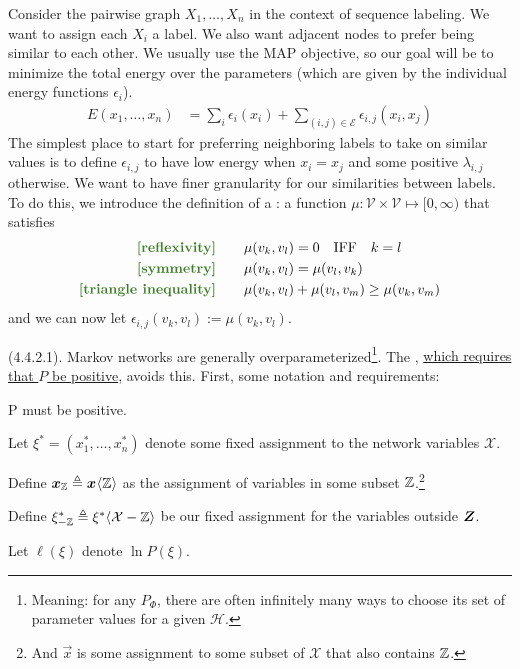 \documentclass[11pt]{article}
\begin{document}
\begin{example}
	Consider the pairwise graph $X_1,\ldots, X_n$ in the context of sequence labeling. We want to assign each $X_i$ a label. We also want adjacent nodes to prefer being similar to each other. We usually use the MAP objective, so our goal will be to minimize the total energy over the parameters (which are given by the individual energy functions $\epsilon_i$).
	\begin{align}
		E(x_1, \ldots, x_n) &= \sum_i \epsilon_i (x_i) + \sum_{(i,j) \in \mathcal{E}} \epsilon_{i,j}(x_i, x_j)
	\end{align}
	The simplest place to start for preferring neighboring labels to take on similar values is to define $\epsilon_{i,j}$ to have low energy when $x_i = x_j$ and some positive $\lambda_{i,j}$ otherwise. We want to have finer granularity for our similarities between labels. To do this, we introduce the definition of a : a function $\mu : \mathcal V \times \mathcal V \mapsto [0, \infty)$ that satisfies
	\begin{align}
		\green{\text{[reflexivity]}}&  \qquad \mu(v_k, v_l) = 0 \quad \text{IFF} \quad k = l \\
		\green{\text{[symmetry]}}& \qquad \mu(v_k, v_l) = \mu(v_l, v_k) \\
		\green{\text{[triangle inequality]}}& \qquad \mu(v_k, v_l) + \mu(v_l, v_m) \ge \mu(v_k, v_m)
	\end{align}
	and we can now let $\epsilon_{i,j}(v_k, v_l) := \mu(v_k, v_l)$. 
\end{example}

\myspace
\p {} (4.4.2.1). Markov networks are generally overparameterized\footnote{Meaning: for any $P_{\Phi}$, there are often infinitely many ways to choose its set of parameter values for a given $\mathcal H$.}. The , \underline{which requires that $P$ be positive}, avoids this. First, some notation and requirements:
\begin{compactitem}
	\item P must be positive. 
	\item Let $\xi^* = (x_1^*, \ldots, x_n^*)$ denote some fixed assignment to the network variables $\mathcal X$. 
	\item Define $\vec[\Z]{x} \triangleq \vec{x}\langle \Z \rangle$ as the assignment of variables in some subset $\Z$.\footnote{And $\vec x$ is some assignment to some subset of $\mathcal X$ that also contains $\Z$.}
	\item Define $\xi^*_{-\Z} \triangleq \xi^*\langle \mathcal X - \Z \rangle$ be our fixed assignment for the variables outside $\matr Z$. 
	\item Let $\ell(\xi)$ denote $\ln P(\xi)$.  
\end{compactitem}
\end{document}
